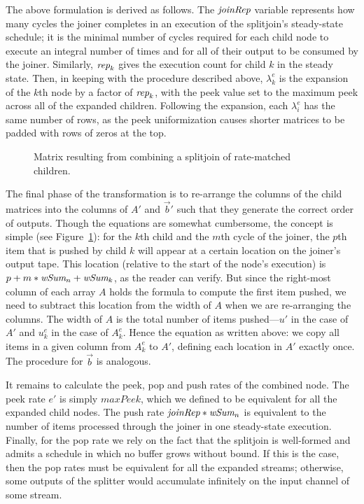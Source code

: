 \documentclass{sig-alternate}
\begin{document}
{The above formulation is derived as follows.  The $\mbox{\it joinRep}$
variable represents how many cycles the joiner completes in an
execution of the splitjoin's steady-state schedule; it is
the minimal number of cycles required for each child node to execute
an integral number of times and for all of their output to be consumed
by the joiner. Similarly, $\mbox{\it rep}_k$ gives the execution count for
child $k$ in the steady state.  Then, in keeping with the procedure
described above, $\lambda_k^e$ is the expansion of the $k$th node by
a factor of $\mbox{\it rep}_k$, with the peek value set to the maximum peek
across all of the expanded children.  Following the expansion, each
$\lambda_i^e$ has the same number of rows, as the peek uniformization
causes shorter matrices to be padded with rows of zeros at the top.

\begin{figure}[t]
\center
\epsfxsize=3.2in
\vspace{-6pt}
\caption{Matrix resulting from combining a splitjoin of rate-matched children.
\protect\label{fig:splitjoin-duplicate-matrix}}
\vspace{-2pt}
\makeline
\vspace{-14pt}
\end{figure}

The final phase of the transformation is to re-arrange the columns of
the child matrices into the columns of $A'$ and $\vec{b}'$ such that
they generate the correct order of outputs.  Though the equations are
somewhat cumbersome, the concept is simple (see
Figure~\ref{fig:splitjoin-duplicate-matrix}): for the $k$th child and
the $m$th cycle of the joiner, the $p$th item that is pushed by child
$k$ will appear at a certain location on the joiner's output tape.
This location (relative to the start of the node's execution) is $p +
m * \mbox{\it wSum}_n + \mbox{\it wSum}_k$, as the reader can verify.  But since
the right-most column of each array $A$ holds the formula to compute
the first item pushed, we need to subtract this location from the
width of $A$ when we are re-arranging the columns. The width of $A$ is
the total number of items pushed---$u'$ in the case of $A'$ and
$u_k^e$ in the case of $A_k^e$.  Hence the equation as written above:
we copy all items in a given column from $A_k^e$ to $A'$, defining
each location in $A'$ exactly once.  The procedure for $\vec{b}$ is
analogous.

It remains to calculate the peek, pop and push rates of the combined
node.  The peek rate $e'$ is simply $maxPeek$, which we defined to be
equivalent for all the expanded child nodes.  The push rate
$\mbox{\it joinRep}*\mbox{\it wSum}_n$ is equivalent to the number of items
processed through the joiner in one steady-state execution.  Finally,
for the pop rate we rely on the fact that the splitjoin is well-formed
and admits a schedule in which no buffer grows without bound.  If this
is the case, then the pop rates must be equivalent for all the
expanded streams; otherwise, some outputs of the splitter would
accumulate infinitely on the input channel of some stream.

}
\end{document}
